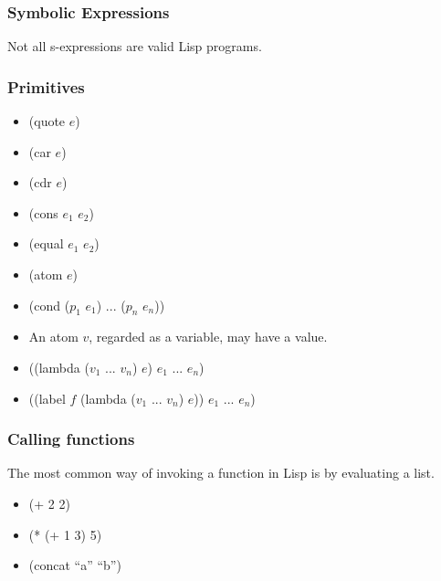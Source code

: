 \documentclass[16pt]{beamer}
\begin{document}
\begin{frame}
  \frametitle{Symbolic Expressions}
  \begin{block}{}
    Not all s-expressions are valid Lisp programs.
  \end{block}
\end{frame}

\begin{frame}
  \frametitle{Primitives}
  \begin{itemize}
  \item (quote $e$)
  \item (car $e$)
  \item (cdr $e$)
  \item (cons $e_1$ $e_2$)
  \item (equal $e_1$ $e_2$)
  \item (atom $e$)
  \item (cond ($p_1$ $e_1$) ... ($p_n$ $e_n$))
  \item An atom $v$, regarded as a variable, may have a value.
  \item ((lambda ($v_1$ ... $v_n$) $e$) $e_1$ ... $e_n$)
  \item ((label $f$ (lambda ($v_1$ ... $v_n$) $e$)) $e_1$ ... $e_n$)
  \end{itemize}
\end{frame}

\begin{frame}
  \frametitle{Calling functions}
  \begin{block}{}
    The most common way of invoking a function in Lisp is by evaluating a list.
  \end{block}
  \begin{itemize}
  \item (+ 2 2)
  \item (* (+ 1 3) 5)
  \item (concat ``a'' ``b'')
  \end{itemize}
\end{frame}
\end{document}
